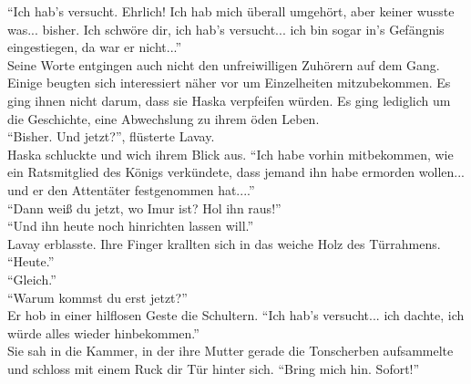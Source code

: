 ``Ich hab's versucht. Ehrlich! Ich hab mich überall umgehört, aber keiner wusste was... bisher. Ich 
schwöre dir, ich hab's versucht... ich bin sogar in's Gefängnis eingestiegen, da war er nicht...''\\
Seine Worte entgingen auch nicht den unfreiwilligen Zuhörern auf dem Gang. Einige beugten sich 
interessiert näher vor um Einzelheiten mitzubekommen. Es ging ihnen nicht darum, dass sie Haska 
verpfeifen würden. Es ging lediglich um die Geschichte, eine Abwechslung zu ihrem öden Leben.\\
``Bisher. Und jetzt?'', flüsterte Lavay.\\
Haska schluckte und wich ihrem Blick aus. ``Ich habe vorhin mitbekommen, wie ein Ratsmitglied des 
Königs verkündete, dass jemand ihn habe ermorden wollen... und er den Attentäter festgenommen 
hat....''\\
``Dann weiß du jetzt, wo Imur ist? Hol ihn raus!''\\
``Und ihn heute noch hinrichten lassen will.''\\
Lavay erblasste. Ihre Finger krallten sich in das weiche Holz des Türrahmens. ``Heute.''\\
``Gleich.''\\
``Warum kommst du erst jetzt?''\\
Er hob in einer hilflosen Geste die Schultern. ``Ich hab's versucht... ich dachte, ich würde alles 
wieder hinbekommen.''\\
Sie sah in die Kammer, in der ihre Mutter gerade die Tonscherben aufsammelte und schloss mit einem 
Ruck dir Tür hinter sich. ``Bring mich hin. Sofort!''\\

